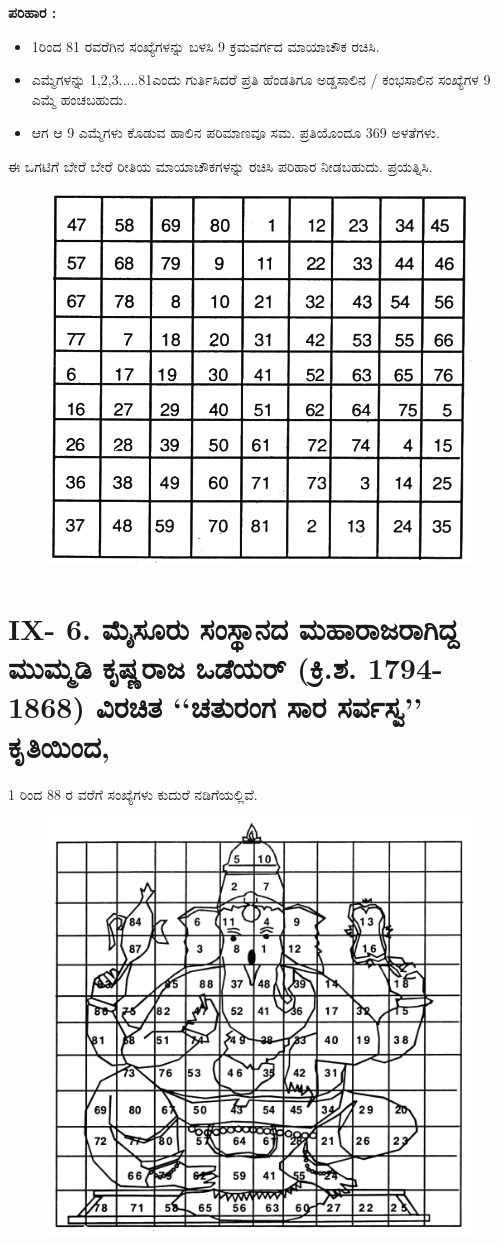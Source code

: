 \medskip
\noindent \textbf{ಪರಿಹಾರ :}
\begin{itemize}
	\item 1ರಿಂದ 81 ರವರೆಗಿನ ಸಂಖ್ಯೆಗಳನ್ನು ಬಳಸಿ 9 ಕ್ರಮವರ್ಗದ ಮಾಯಾಚೌಕ ರಚಿಸಿ.
	\item ಎಮ್ಮೆಗಳನ್ನು 1,2,3.....81ಎಂದು ಗುರ್ತಿಸಿದರೆ ಪ್ರತಿ ಹೆಂಡತಿಗೂ ಅಡ್ಡಸಾಲಿನ / ಕಂಭಸಾಲಿನ ಸಂಖ್ಯೆಗಳ 9 ಎಮ್ಮೆ ಹಂಚಬಹುದು.
	\item ಆಗ ಆ 9 ಎಮ್ಮೆಗಳು ಕೊಡುವ ಹಾಲಿನ ಪರಿಮಾಣವೂ ಸಮ. ಪ್ರತಿಯೊಂದೂ 369 ಅಳತೆಗಳು.
\end{itemize}
ಈ ಒಗಟಿಗೆ ಬೇರೆ ಬೇರೆ ರೀತಿಯ ಮಾಯಾಚೌಕಗಳನ್ನು ರಚಿಸಿ ಪರಿಹಾರ ನೀಡಬಹುದು. ಪ್ರಯತ್ನಿಸಿ.
\begin{figure}[H]
\includegraphics[scale=.85]{src/figures/chap8/fig8-12.jpg}
\end{figure}

\section*{IX- 6. ಮೈಸೂರು ಸಂಸ್ಥಾನದ ಮಹಾರಾಜರಾಗಿದ್ದ ಮುಮ್ಮಡಿ ಕೃಷ್ಣರಾಜ ಒಡೆಯರ್ (ಕ್ರಿ.ಶ. 1794-1868) ವಿರಚಿತ ‘‘ಚತುರಂಗ ಸಾರ ಸರ್ವಸ್ವ’’ ಕೃತಿಯಿಂದ,}

1 ರಿಂದ 88 ರ ವರೆಗೆ ಸಂಖ್ಯೆಗಳು ಕುದುರೆ ನಡಿಗೆಯಲ್ಲಿವೆ.
\begin{figure}[H]
\includegraphics[scale=.75]{src/figures/chap8/fig8-13.jpg}
\end{figure}
